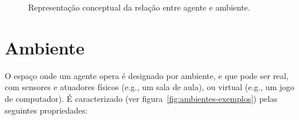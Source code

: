 \begin{figure}[H]
    \begin{center}
    \end{center}
    \caption{Representação conceptual da
    relação entre agente e ambiente.}\label{fig:modelo-agente-ambiente}
\end{figure}


\section{Ambiente}

O espaço onde um agente opera é designado por ambiente, e que pode ser real, com sensores e atuadores físicos (e.g., um sala de aula), ou virtual (e.g., um jogo de computador).
É caracterizado (ver figura~\ref{fig:ambientes-exemplos}) pelas seguintes propriedades:

